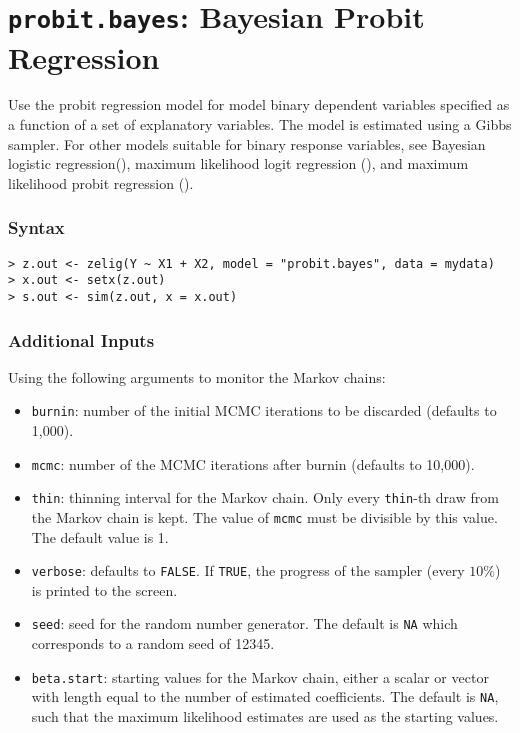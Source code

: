 \section{\texttt{probit.bayes}: Bayesian Probit Regression}
\label{probit.bayes}

Use the probit regression model for model binary dependent variables
specified as a function of a set of explanatory variables.  The model
is estimated using a Gibbs sampler.  For other models suitable for
binary response variables, see Bayesian logistic
regression(), maximum likelihood logit regression
(), and maximum likelihood probit regression
().  

\subsubsection{Syntax}
\begin{verbatim}
> z.out <- zelig(Y ~ X1 + X2, model = "probit.bayes", data = mydata)
> x.out <- setx(z.out)
> s.out <- sim(z.out, x = x.out)
\end{verbatim}

\subsubsection{Additional Inputs}

Using the following arguments to monitor the Markov chains:  
\begin{itemize}
\item \texttt{burnin}: number of the initial MCMC iterations to be 
 discarded (defaults to 1,000).

\item \texttt{mcmc}: number of the MCMC iterations after burnin
(defaults to 10,000).

\item \texttt{thin}: thinning interval for the Markov chain. Only every 
 \texttt{thin}-th draw from the Markov chain is kept. The value of 
\texttt{mcmc} must be divisible by this value. The default value is 1.

\item \texttt{verbose}: defaults to {\tt FALSE}.  If \texttt{TRUE},
the progress of the sampler (every $10\%$) is printed to the screen.

\item \texttt{seed}: seed for the random number generator. The default is 
\texttt{NA} which corresponds to a random seed of 12345. 

\item \texttt{beta.start}: starting values for the Markov 
chain, either a scalar or vector with length equal to the number of
estimated coefficients. The default is \texttt{NA}, such that the
maximum likelihood estimates are used as the starting values.

\end{itemize}

